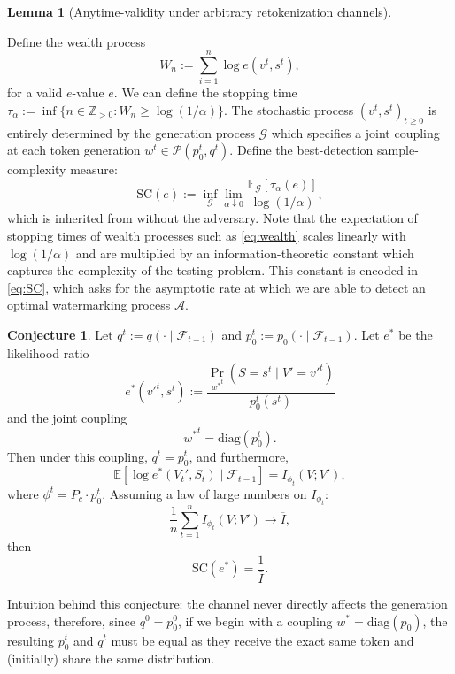 \documentclass[12pt]{article}
\theoremstyle{plain}
\newtheorem{lemma}[theorem]{Lemma}
\theoremstyle{definition}
\newtheorem{conjecture}[theorem]{Conjecture}
\begin{document}
\begin{lemma}[Anytime-validity under arbitrary retokenization channels]

    
\end{lemma}
Define the wealth process
\begin{equation}\label{eq:wealth}
    W_n := \sum_{i=1}^{n}\log e(v^t,s^t),
\end{equation}
for a valid $e$-value $e.$ We can define the stopping time $\tau_\alpha := \inf\{n \in \mathbb{Z}_{> 0}: W_n \ge \log(1/\alpha)\}.$ The stochastic process $(v^t,s^t)_{t\ge 0}$ is entirely determined by the generation process $\mathcal{G}$ which specifies a joint coupling at each token generation $w^t \in \mathcal{P}(p_0^t,q^t)$. Define the best-detection sample-complexity measure:
\begin{equation}\label{eq:SC}
    \text{SC}(e) := \inf_{\mathcal{G}}\lim_{\alpha\downarrow 0}\frac{\mathbb{E}_\mathcal{G}[\tau_\alpha(e)]}{\log(1/\alpha)},
\end{equation}
which is inherited from \cite{huang2026anytime} without the adversary. Note that the expectation of stopping times of wealth processes such as \eqref{eq:wealth} scales linearly with $\log(1/\alpha)$ and are multiplied by an information-theoretic constant which captures the complexity of the testing problem. This constant is encoded in \eqref{eq:SC}, which asks for the asymptotic rate at which we are able to detect an optimal watermarking process $\mathcal{A}$.
\begin{conjecture}
Let $q^t := q(\cdot\mid \mathcal{F}_{t-1})$ and $p_0^t := p_0(\cdot \mid \mathcal{F}_{t-1})$. Let $e^*$ be the likelihood ratio
\begin{equation}\label{eq:optimal_e}
    e^*( v'^t, s^t) := \frac{\Pr_{{w^*}^t}(S=s^t\mid V' = v'^t)}{p_0^t(s^t)}
\end{equation}
and the joint coupling
\begin{equation}
    {w^*}^t = \text{diag}(p_0^t).
\end{equation}
Then under this coupling, $q^t = p_0^t$, and furthermore, 
\[\mathbb{E}[\log e^*(V_t',S_t)\mid \mathcal{F}_{t-1}] = I_{\phi_t}(V;V'),\]
where $\phi^t = P_c \cdot p_0^t$. Assuming a law of large numbers on $I_{\phi_t}$:
\[\frac{1}{n}\sum_{t=1}^nI_{\phi_t}(V;V') \to \overline{I},\]
then
\[\text{SC}(e^*) = \frac{1}{\overline{I}}.\]
\end{conjecture}
Intuition behind this conjecture: the channel never directly affects the generation process, therefore, since $q^0 = p^0_0$, if we begin with a coupling $w^* = \text{diag}(p_0)$, the resulting $p_0^t$ and $q^t$ must be equal as they receive the exact same token and (initially) share the same distribution. 
\end{document}
